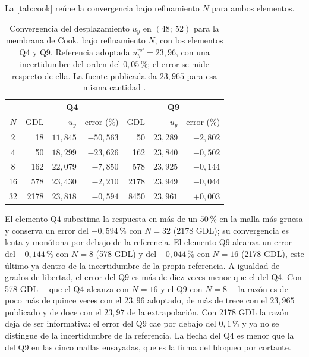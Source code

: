 La \autoref{tab:cook} reúne la convergencia bajo refinamiento $N$ para ambos elementos.

\begin{table}[htbp]
\centering
\caption[Convergencia del desplazamiento $u_y$ en $(48;\ 52)$ para la membrana de Cook.]{Convergencia del desplazamiento $u_y$ en $(48;\ 52)$ para la membrana de Cook, bajo refinamiento $N$, con los elementos Q4 y Q9. Referencia adoptada $u_y^{\text{ref}} = 23{,}96$, con una incertidumbre del orden del $0{,}05\,\%$; el error se mide respecto de ella. La fuente publicada da $23{,}965$ para esa misma cantidad \autocite[p.~28]{stembera2019dkmq24}.}
\label{tab:cook}
\begin{tabular}{c r r r r r r}
\hline
 & \multicolumn{3}{c}{\textbf{Q4}} & \multicolumn{3}{c}{\textbf{Q9}} \\
$N$ & GDL & $u_y$ & error (\%) & GDL & $u_y$ & error (\%) \\
\hline
2  & 18   & $11{,}845$ & $-50{,}563$ & 50   & $23{,}289$ & $-2{,}802$ \\
4  & 50   & $18{,}299$ & $-23{,}626$ & 162  & $23{,}840$ & $-0{,}502$ \\
8  & 162  & $22{,}079$ & $-7{,}850$  & 578  & $23{,}925$ & $-0{,}144$ \\
16 & 578  & $23{,}430$ & $-2{,}210$  & 2178 & $23{,}949$ & $-0{,}044$ \\
32 & 2178 & $23{,}818$ & $-0{,}594$  & 8450 & $23{,}961$ & $+0{,}003$ \\
\hline
\end{tabular}
\end{table}

El elemento Q4 subestima la respuesta en más de un $50\,\%$ en la malla más gruesa y conserva un error del $-0{,}594\,\%$ con $N=32$ (2178 GDL); su convergencia es lenta y monótona por debajo de la referencia. El elemento Q9 alcanza un error del $-0{,}144\,\%$ con $N=8$ (578 GDL) y del $-0{,}044\,\%$ con $N=16$ (2178 GDL), este último ya dentro de la incertidumbre de la propia referencia. A igualdad de grados de libertad, el error del Q9 es más de diez veces menor que el del Q4. Con 578 GDL ---que el Q4 alcanza con $N=16$ y el Q9 con $N=8$--- la razón es de poco más de quince veces con el $23{,}96$ adoptado, de más de trece con el $23{,}965$ publicado y de doce con el $23{,}97$ de la extrapolación. Con 2178 GDL la razón deja de ser informativa: el error del Q9 cae por debajo del $0{,}1\,\%$ y ya no se distingue de la incertidumbre de la referencia. La flecha del Q4 es menor que la del Q9 en las cinco mallas ensayadas, que es la firma del bloqueo por cortante.

